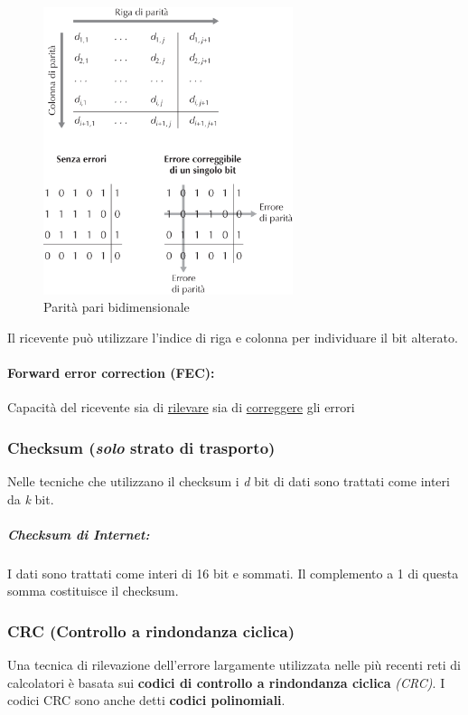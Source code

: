 \documentclass[12pt]{article}
\begin{document}
    \begin{figure}[!htb]
        \centering
        \includegraphics[width=0.65\textwidth]{paritybid.png}
        \caption{Parità pari bidimensionale}
    \end{figure}

    Il ricevente può utilizzare l'indice di riga e colonna per individuare il bit alterato.
    \FloatBarrier

    \paragraph{Forward error correction (FEC):} Capacità del ricevente sia di \underline{rilevare} sia di \underline{correggere} gli errori

    \subsubsection{Checksum (\textit{solo} strato di trasporto)} 
    Nelle tecniche che utilizzano il checksum i \textit{d} bit di dati sono trattati come interi da \textit{k} bit.
    \subparagraph{Checksum di Internet:} I dati sono trattati come interi di 16 bit e sommati. Il complemento a 1 di questa somma costituisce il checksum.

    \subsubsection{CRC (Controllo a rindondanza ciclica)}
    Una tecnica di rilevazione dell'errore largamente utilizzata nelle più recenti reti di calcolatori è basata sui \textbf{codici di controllo a rindondanza ciclica} \textit{(CRC)}. I codici CRC sono anche detti \textbf{codici polinomiali}.
\end{document}
